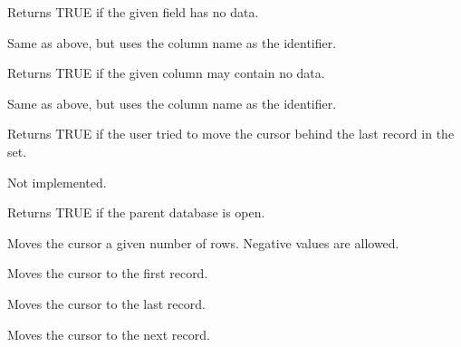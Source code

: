 

Returns TRUE if the given field has no data.


Same as above, but uses the column name as the identifier.



Returns TRUE if the given column may contain no data.


Same as above, but uses the column name as the identifier.



Returns TRUE if the user tried to move the cursor behind the last record
in the set.



Not implemented.
  


Returns TRUE if the parent database is open.



Moves the cursor a given number of rows. Negative values are allowed.
  


Moves the cursor to the first record.
  


Moves the cursor to the last record.
  
\label{wxrecordsetmovenext}


Moves the cursor to the next record.
  
